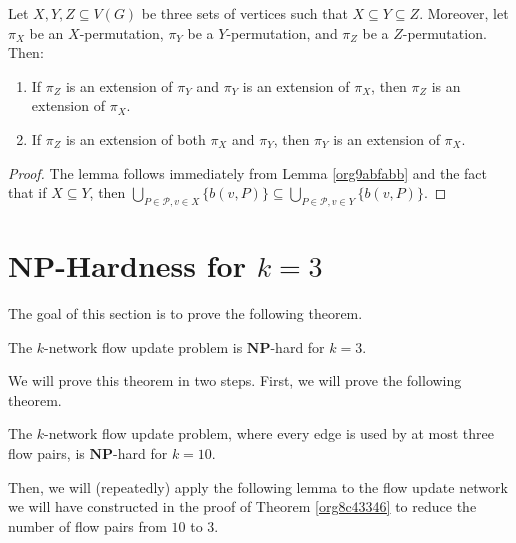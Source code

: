 \documentclass[fontsize=11pt,paper=a4]{book}
\begin{document}
\begin{lem}
Let \(X,Y,Z\subseteq V(G)\) be three sets of vertices such that \(X\subseteq Y\subseteq Z\).
Moreover, let \(\pi_X\) be an \(X\)-permutation, \(\pi_Y\) be a \(Y\)-permutation, and \(\pi_Z\) be a \(Z\)-permutation.
Then:

\begin{enumerate}
\item \label{itm:lem-three-permutations-2-1}
If \(\pi_Z\) is an extension of \(\pi_Y\) and \(\pi_Y\) is an extension of \(\pi_X\), then \(\pi_Z\) is an extension of \(\pi_X\).

\item \label{itm:lem-three-permutations-2-2}
If \(\pi_Z\) is an extension of both \(\pi_X\) and \(\pi_Y\), then \(\pi_Y\) is an extension of \(\pi_X\).
\end{enumerate}
\label{org7b57a33}
\end{lem}

\begin{proof}
The lemma follows immediately from Lemma \ref{org9abfabb} and the fact that if \(X\subseteq Y\), then \(\bigcup_{P\in\mathcal{P},v\in X}\{b(v,P)\}\subseteq\bigcup_{P\in\mathcal{P},v\in Y}\{b(v,P)\}\).
\end{proof}

\part{\(\textbf{NP}\)-Hardness for \(k=3\)}
\label{sec:orgab82979}

The goal of this section is to prove the following theorem.

\begin{thm}
The \(k\)-network flow update problem is \(\textbf{NP}\)-hard for \(k=3\).
\label{org1e51ebf}
\end{thm}

We will prove this theorem in two steps.
First, we will prove the following theorem.

\begin{thm}
The \(k\)-network flow update problem, where every edge is used by at most three flow pairs, is \(\textbf{NP}\)-hard for \(k=10\).
\label{org8c43346}
\end{thm}

Then, we will (repeatedly) apply the following lemma to the flow update network we will have constructed in the proof of Theorem \ref{org8c43346} to reduce the number of flow pairs from \(10\) to \(3\).
\end{document}
